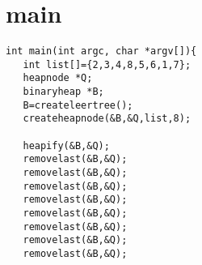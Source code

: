 \documentclass{article}[12pt]
\begin{document}
\section{main}
\begin{lstlisting}
int main(int argc, char *argv[]){
   int list[]={2,3,4,8,5,6,1,7};
   heapnode *Q;
   binaryheap *B;
   B=createleertree();
   createheapnode(&B,&Q,list,8);

   heapify(&B,&Q);
   removelast(&B,&Q);
   removelast(&B,&Q);
   removelast(&B,&Q);
   removelast(&B,&Q);
   removelast(&B,&Q);
   removelast(&B,&Q);
   removelast(&B,&Q);
   removelast(&B,&Q);

\end{lstlisting}
\end{document}

